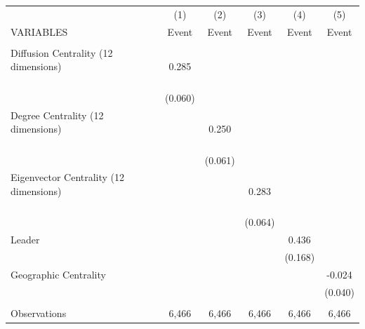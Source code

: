 \begin{tabular}{lccccc} \hline
 & (1) & (2) & (3) & (4) & (5) \\
VARIABLES & Event & Event & Event & Event & Event \\ \hline
 &  &  &  &  &  \\
Diffusion Centrality (12 dimensions) \ \ \ \ \ \ \ \ \ \ \ \ \ \ \ \ \ \ \ \ \ \ & 0.285 &  &  &  &  \\
 & (0.060) &  &  &  &  \\
Degree Centrality (12 dimensions) \ \ \ \ \ \ \ \ \ \ \ \ \ \ \ \ \ \ \ \ \ \ \ &  & 0.250 &  &  &  \\
 &  & (0.061) &  &  &  \\
Eigenvector Centrality (12 dimensions) \ \ \ \ \ \ \ \ \ \ \ \ \ \ \ \ \ \ \ \ \ &  &  & 0.283 &  &  \\
 &  &  & (0.064) &  &  \\
Leader &  &  &  & 0.436 &  \\
 &  &  &  & (0.168) &  \\
Geographic Centrality &  &  &  &  & -0.024 \\
 &  &  &  &  & (0.040) \\
 &  &  &  &  &  \\
 Observations & 6,466 & 6,466 & 6,466 & 6,466 & 6,466 \\ \hline
\end{tabular}

